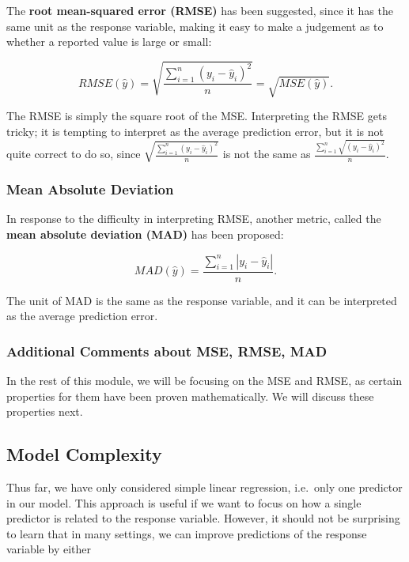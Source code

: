\documentclass[
]{book}
\begin{document}
The \textbf{root mean-squared error (RMSE)} has been suggested, since it has the same unit as the response variable, making it easy to make a judgement as to whether a reported value is large or small:

\begin{equation} 
RMSE(\hat{y}) = \sqrt{\frac{\sum_{i=1}^n (y_i - \hat{y}_i)^2}{n}} = \sqrt{MSE(\hat{y})}.
\label{eq:10-RMSE}
\end{equation}

The RMSE is simply the square root of the MSE. Interpreting the RMSE gets tricky; it is tempting to interpret as the average prediction error, but it is not quite correct to do so, since \(\sqrt{\frac{\sum_{i=1}^n (y_i - \hat{y}_i)^2}{n}}\) is not the same as \(\frac{\sum_{i=1}^n \sqrt{(y_i - \hat{y}_i)^2}}{n}\).

\hypertarget{mean-absolute-deviation}{%
\subsubsection{Mean Absolute Deviation}\label{mean-absolute-deviation}}

In response to the difficulty in interpreting RMSE, another metric, called the \textbf{mean absolute deviation (MAD)} has been proposed:

\begin{equation} 
MAD(\hat{y}) = \frac{\sum_{i=1}^n |y_i - \hat{y}_i|}{n}.
\label{eq:10-MAD}
\end{equation}

The unit of MAD is the same as the response variable, and it can be interpreted as the average prediction error.

\hypertarget{additional-comments-about-mse-rmse-mad}{%
\subsubsection{Additional Comments about MSE, RMSE, MAD}\label{additional-comments-about-mse-rmse-mad}}

In the rest of this module, we will be focusing on the MSE and RMSE, as certain properties for them have been proven mathematically. We will discuss these properties next.

\hypertarget{model-complexity}{%
\subsection{Model Complexity}\label{model-complexity}}

Thus far, we have only considered simple linear regression, i.e.~only one predictor in our model. This approach is useful if we want to focus on how a single predictor is related to the response variable. However, it should not be surprising to learn that in many settings, we can improve predictions of the response variable by either
\end{document}
